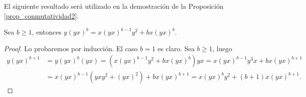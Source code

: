 \documentclass[fleqn,../tesis.tex]{subfiles}
\begin{document}
El siguiente resultado será utilizado en la demostración de la Proposición \ref{prop_conmutatividad2}.
\begin{prop}
\label{prop_conmutatividad2_aux}
Sea $b \geq 1$, entonces $y(yx)^b = x(yx)^{b - 1}y^2 + bx(yx)^b$.
\end{prop}
\begin{proof}
Lo probaremos por inducción. El caso $b = 1$ es claro. Sea $b \geq 1$, luego
\begin{align*}
	y(yx)^{b + 1} &= y(yx)^b(yx) = (x(yx)^{b - 1}y^2 + bx(yx)^b)yx = x(yx)^{b - 1}y^3x + bx(yx)^{b + 1}\\
	&= x(yx)^{b - 1}(yxy^2 + (yx)^2) + bx(yx)^{b + 1} = x(yx)^{b}y^2 + (b + 1)x(yx)^{b + 1}.
\end{align*}
\end{proof}
\end{document}
